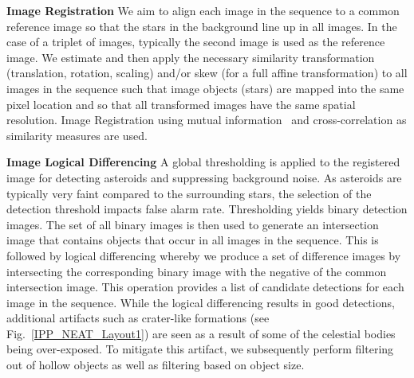 \documentclass{article}
\begin{document}
{\bf Image Registration}
We aim to align each image in the sequence to a common reference image so that the stars in the background line up in all images.  In the case of a triplet of images, typically the second image is used as the reference image.  We estimate and then apply the necessary similarity transformation (translation, rotation, scaling) and/or skew (for a full affine transformation) to all images in the sequence such that image objects (stars) are mapped into the same pixel location and so that all transformed images have the same spatial resolution.  Image Registration using mutual information~\cite{viola1997alignment} and cross-correlation as similarity measures are used. 

{\bf Image Logical Differencing}
A global thresholding is applied to the registered image for detecting asteroids and suppressing background noise.  As asteroids are typically very faint compared to the surrounding stars, the selection of the detection threshold impacts false alarm rate.  Thresholding yields binary detection images.  The set of all binary images is then used to generate an intersection image that contains objects that occur in all images in the sequence.  This is followed by logical differencing whereby we produce a set of difference images by intersecting the corresponding binary image with the negative of the common intersection image.  This operation provides a list of candidate detections for each image in the sequence.  While the logical differencing results in good detections, additional artifacts such as crater-like formations (see Fig.~\ref{IPP_NEAT_Layout1}) are seen as a result of some of the celestial bodies being over-exposed.  To mitigate this artifact, we subsequently perform filtering out of hollow objects as well as filtering based on object size.
\end{document}
